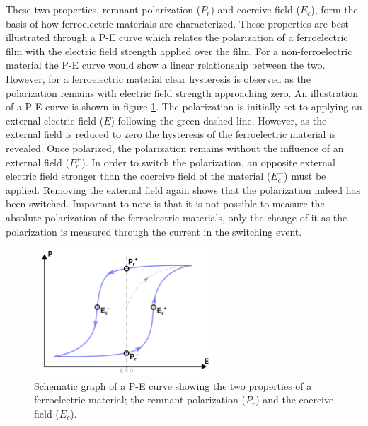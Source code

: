 \documentclass[11pt,twoside]{eitExjobb}
\begin{document}
These two properties, remnant polarization ($P_r$) and coercive field ($E_c$),
form the basis of how ferroelectric materials are characterized. These
properties are best illustrated through a P-E curve which relates the
polarization of a ferroelectric film with the electric field strength applied
over the film. For a non-ferroelectric material the P-E curve would show a
linear relationship between the two. However, for a ferroelectric material clear
hysteresis is observed as the polarization remains with electric field
strength approaching zero. An illustration of a P-E curve is shown in figure
\ref{fig:theo_PE}. The polarization is initially set to applying an external
electric field ($E$) following the green dashed line. However, as the external
field is reduced to zero the hysteresis of the ferroelectric material is
revealed. Once polarized, the polarization remains without the influence of an
external field ($P_r^+$). In order to switch the polarization, an opposite
external electric field stronger than the coercive field of the
material ($E_c^-$) must be applied. Removing the external field again shows
that the polarization indeed has been switched. Important to note is that it is
not possible to measure the absolute polarization of the ferroelectric
materials, only the change of it as the polarization is measured through the
current in the switching event.

\begin{figure}[htbp]
    \centering
    \includegraphics[width=0.60\textwidth]{fig/img/PE.png}
    \caption{Schematic graph of a P-E curve showing the two properties of a
        ferroelectric material; the remnant polarization ($P_r$) and the
        coercive field ($E_c$).}
    \label{fig:theo_PE}
\end{figure}

\subsection{}
\end{document}
